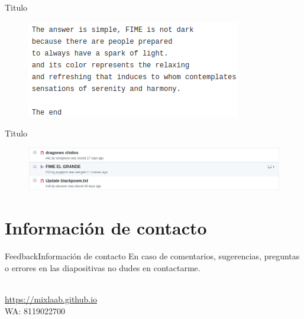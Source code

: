 \documentclass[10pt]{beamer}
\newcommand{\chref}[2]{%
  \href{#1}{{\usebeamercolor[bg]{Aalborg}#2}}%
}
\begin{document}
\begin{frame}{Titulo}{}

  \begin{block}{}
  
  \begin{figure}[h!]
  \centering
  \includegraphics [scale=0.28]{step15_2}
  \label{fig:step15_2}
  \end{figure}
      
  \end{block}
  
\end{frame}

\begin{frame}{Titulo}{}

  \begin{block}{}
  
  \begin{figure}[h!]
  \centering
  \includegraphics [scale=0.28]{step16}
  \label{fig:step16}
  \end{figure}
      
  \end{block}
  
\end{frame}

\section{Información de contacto}
\begin{frame}{Feedback}{Información de contacto}
En caso de comentarios, sugerencias, preguntas o errores en las diapositivas no dudes en contactarme.
  \begin{center}
    \insertauthor\\
    \chref{https://mixlaab.github.io}{https://mixlaab.github.io}\\
    WA: 8119022700\\
  \end{center}
\end{frame}

{\aauwavesbg%
\begin{frame}%
\end{frame}}
\end{document}
